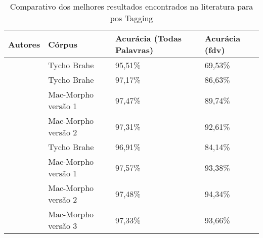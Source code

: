 \begin{table}[!htb]
\footnotesize
\centering
\caption{Comparativo dos melhores resultados encontrados na literatura para \ac{pos} Tagging}
\label{tab:comparacaotrabsrelac}
\begin{tabular}{llP{3cm}P{3cm}}
  \toprule
  \textbf{Autores} & \textbf{Córpus} & \textbf{Acurácia (Todas Palavras)} & \textbf{Acurácia (\ac{fdv})} \\
  \midrule
  \centering
   & Tycho Brahe & 95,51\% & 69,53\% \\
   		 & Tycho Brahe & 97,17\% & 86,63\% \\
   		 & Mac-Morpho versão 1 & 97,47\% & 89,74\% \\
   		 & Mac-Morpho versão 2 & 97,31\% & 92,61\% \\
    & Tycho Brahe & 96,91\% & 84,14\% \\
    & Mac-Morpho versão 1 & 97,57\% & 93,38\% \\
    & Mac-Morpho versão 2 & 97,48\% & 94,34\% \\
    & Mac-Morpho versão 3 & 97,33\% & 93,66\% \\
  \bottomrule
\end{tabular}
\end{table}


